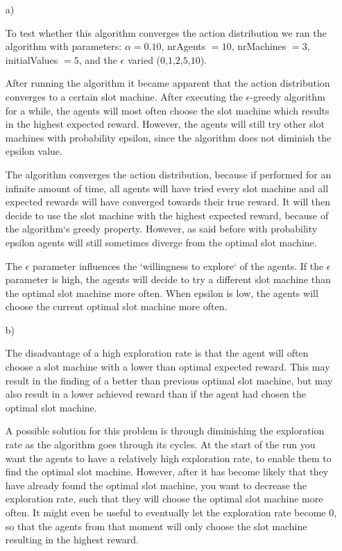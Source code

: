 \documentclass[12pt]{article}
\begin{document}
\begin{enumerate}
	\item[a)]

	To test whether this algorithm converges the action distribution we ran the algorithm with parameters: $\alpha = 0.10$,
	nrAgents $= 10$, nrMachines $=3$, initialValues $=5$,
	and the $\epsilon$ varied ($0$,$1$,$2$,$5$,$10$).

	After running the algorithm it became apparent that the action distribution converges to a certain slot machine. After executing the $\epsilon$-greedy algorithm for a while, the agents will most often choose the slot machine which results in the highest expected reward. However, the agents will still try other slot machines with probability epsilon, since the algorithm does not diminish the epsilon value.

    The algorithm converges the action distribution, because if performed for an infinite amount of time, all agents will have tried every slot machine and all expected rewards will have converged towards their true reward. It will then decide to use the slot machine with the highest expected reward, because of the algorithm`s greedy property. However, as said before with probability epsilon agents will still sometimes diverge from the optimal slot machine.

    The $\epsilon$ parameter influences the `willingness to explore` of the agents. If the $\epsilon$ parameter is high, the agents will decide to try a different slot machine than the optimal slot machine more often. When epsilon is low, the agents will choose the current optimal slot machine more often.


	\item[b)]

	The disadvantage of a high exploration rate is that the agent will often choose a slot machine with a lower than optimal expected reward. This may result in the finding of a better than previous optimal slot machine, but may also result in a lower achieved reward than if the agent had chosen the optimal slot machine.

    A possible solution for this problem is through diminishing the exploration rate as the algorithm goes through its cycles. At the start of the run you want the agents to have a relatively high exploration rate, to enable them to find the optimal slot machine. However, after it has become likely that they have already found the optimal slot machine, you want to decrease the exploration rate, such that they will choose the optimal slot machine more often. It might even be useful to eventually let the exploration rate become 0, so that the agents from that moment will only choose the slot machine resulting in the highest reward.

\end{enumerate}
\end{document}
